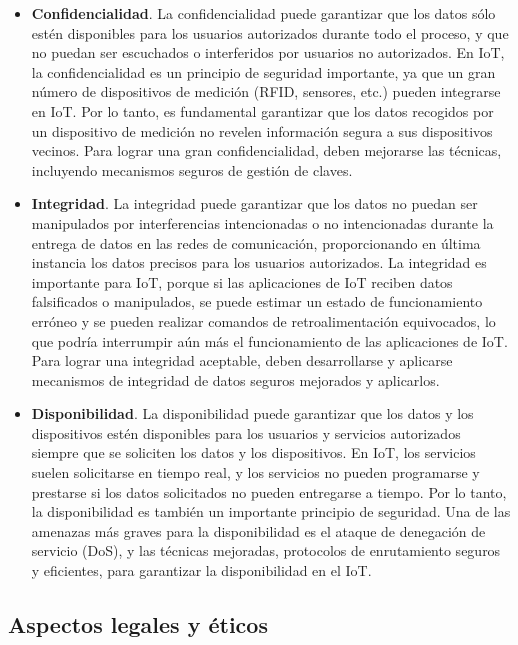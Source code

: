 {\begin{itemize}
    \item  \textbf{Confidencialidad}. La confidencialidad puede garantizar que los datos sólo estén disponibles para los usuarios autorizados durante todo el proceso, y que no puedan ser escuchados o interferidos por usuarios no autorizados. En IoT, la confidencialidad es un principio de seguridad importante, ya que un gran número de dispositivos de medición (RFID, sensores, etc.) pueden integrarse en IoT. Por lo tanto, es fundamental garantizar que los datos recogidos por un dispositivo de medición no revelen información segura a sus dispositivos vecinos. Para lograr una gran confidencialidad, deben mejorarse las técnicas, incluyendo mecanismos seguros de gestión de claves.
    \item  \textbf{Integridad}. La integridad puede garantizar que los datos no puedan ser manipulados por interferencias intencionadas o no intencionadas durante la entrega de datos en las redes de comunicación, proporcionando en última instancia los datos precisos para los usuarios autorizados. La integridad es importante para IoT, porque si las aplicaciones de IoT reciben datos falsificados o manipulados, se puede estimar un estado de funcionamiento erróneo y se pueden realizar comandos de retroalimentación equivocados, lo que podría interrumpir aún más el funcionamiento de las aplicaciones de IoT. Para lograr una integridad aceptable, deben desarrollarse y aplicarse mecanismos de integridad de datos seguros mejorados y aplicarlos.
    \item \textbf{Disponibilidad}. La disponibilidad puede garantizar que los datos y los dispositivos estén disponibles para los usuarios y servicios autorizados siempre que se soliciten los datos y los dispositivos. En IoT, los servicios suelen solicitarse en tiempo real, y los servicios no pueden programarse y prestarse si los datos solicitados no pueden entregarse a tiempo. Por lo tanto, la disponibilidad es también un importante principio de seguridad. Una de las amenazas más graves para la disponibilidad es el ataque de denegación de servicio (DoS), y las técnicas mejoradas, protocolos de enrutamiento seguros y eficientes, para garantizar la disponibilidad en el IoT.

\end{itemize}


\subsection{Aspectos legales y éticos}



}